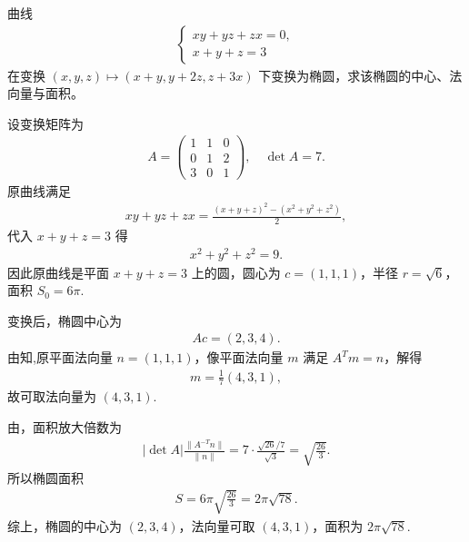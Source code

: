 \documentclass[../../main.tex]{subfiles}%
\begin{document}
\begin{example}
曲线
\begin{align*}
\begin{cases}
xy+yz+zx=0,\\
x+y+z=3
\end{cases}
\end{align*}
在变换 $(x,y,z)\mapsto (x+y, y+2z, z+3x)$ 下变换为椭圆，求该椭圆的中心、法向量与面积。
\end{example}
\begin{solution}
设变换矩阵为
\begin{align*}
A=\begin{pmatrix}
1&1&0\\
0&1&2\\
3&0&1
\end{pmatrix},
\quad \det A=7.\label{eq:detA_02}
\end{align*}
原曲线满足
\begin{align*}
xy+yz+zx=\frac{(x+y+z)^2-(x^2+y^2+z^2)}2,
\end{align*}
代入 $x+y+z=3$ 得
\begin{align*}
x^2+y^2+z^2=9.
\end{align*}
因此原曲线是平面 $x+y+z=3$ 上的圆，圆心为 $c=(1,1,1)$，半径 $r=\sqrt{6}$，面积 $S_0=6\pi$.

变换后，椭圆中心为
\begin{align*}
Ac=(2,3,4).
\end{align*}
由知,原平面法向量 $n=(1,1,1)$，像平面法向量 $m$ 满足 $A^T m=n$，解得
\begin{align*}
m=\frac17(4,3,1),
\end{align*}
故可取法向量为 $(4,3,1)$.

由，面积放大倍数为
\begin{align*}
|\det A|\frac{\|A^{-T}n\|}{\|n\|}
=7\cdot \frac{\sqrt{26}/7}{\sqrt3}
=\sqrt{\frac{26}{3}}.
\end{align*}
所以椭圆面积
\begin{align*}
S=6\pi\sqrt{\frac{26}{3}}=2\pi\sqrt{78}.
\end{align*}
综上，椭圆的中心为 $(2,3,4)$，法向量可取 $(4,3,1)$，面积为 $2\pi\sqrt{78}$.
\end{solution}
\end{document}

